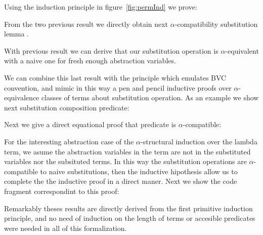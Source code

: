 \documentclass{entcs}
\newcommand{\alp}{\ensuremath{\alpha}}
\begin{document}
 \hspace{5px}

Using the induction principle in figure~\ref{fig:permInd} we prove:

 \hspace{5px}

From the two previous result we directly obtain next \alp-compatibility substitution lemma .

 \hspace{5px}

With previous result we can derive that our substitution operation is \alp-equivalent with a naive one for fresh enough abstraction variables.

 \hspace{5px}

We can combine this last result with the  principle which emulates BVC convention, and mimic in this way a pen and pencil inductive proofs over \alp-equivalence classes of terms about substitution operation. As an example we show next substitution composition predicate:

 \hspace{5px}

Next we give a direct equational proof that  predicate is \alp-compatible:

 \hspace{5px}

For the interesting abstraction case of the \alp-structural induction over the lambda term, we asume the abstraction variables in the term are not in the substituted variables nor the subsituted terms. In this way the substitution operations are \alp-compatible to naive substitutions, then the inductive hipothesis allow us to complete the the inductive proof in a direct maner. Next we show the code fragment correspondint to this proof:
 
 \hspace{5px}

Remarkably theses results are directly derived from the first primitive induction principle, and no need of induction on the length of terms or accesible predicates were needed in all of this formalization.
\end{document}
